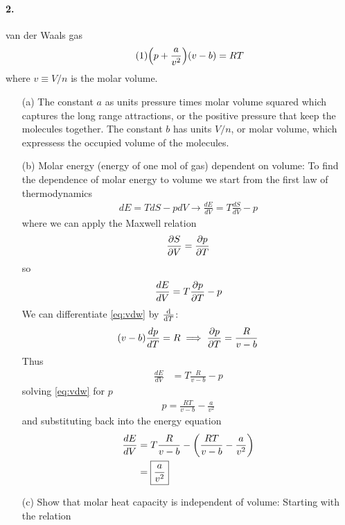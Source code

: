 \documentclass[../main.tex]{subfiles}
\begin{document}
\paragraph{2.} van der Waals gas
\begin{align*} \tag{1} \label{eq:vdw}
    \qt(p + \frac{a}{v^2})(v - b) = RT
\end{align*}
where $v \equiv V/n$ is the molar volume.
\begin{enumerate}
    \item [(a)] The constant $a$ as units pressure times molar volume squared which captures the long range attractions, or the positive pressure that keep the molecules together. 
    The constant $b$ has units $V/n$, or molar volume, which expressess the occupied volume of the molecules.
    \item [(b)] Molar energy (energy of one mol of gas) dependent on volume:
    To find the dependence of molar energy to volume we start from the first law of thermodynamics
    \begin{align*}
        dE = TdS - pdV \to \frac{dE}{dV} = T\frac{dS}{dV} - p
    \end{align*}
    where we can apply the Maxwell relation
    \begin{align*}
        \pdv{S}{V} = \pdv{p}{T}
    \end{align*}
    so
    \begin{align*}
        \frac{dE}{dV} = T\pdv{p}{T} - p
    \end{align*}
    We can differentiate \eqref{eq:vdw} by $\dv{T}$:
    \begin{align*}
        (v - b) \frac{dp}{dT} = R \implies \pdv{p}{T} = \frac{R}{v - b}
    \end{align*}
    Thus
    \begin{align*}
        \frac{dE}{dV} &= T\frac{R}{v - b} - p 
    \end{align*}
    solving \eqref{eq:vdw} for $p$
    \begin{align*}
        p = \frac{RT}{v - b} - \frac{a}{v^2}
    \end{align*}
    and substituting back into the energy equation
    \begin{align*}
        \frac{dE}{dV} &= T\frac{R}{v - b} - \qt(\frac{RT}{v - b} - \frac{a}{v^2}) \\
        &= \boxed{\frac{a}{v^2}}
    \end{align*}
    \item [(c)] Show that molar heat capacity is independent of volume: Starting with the relation

\end{enumerate}
\end{document}
